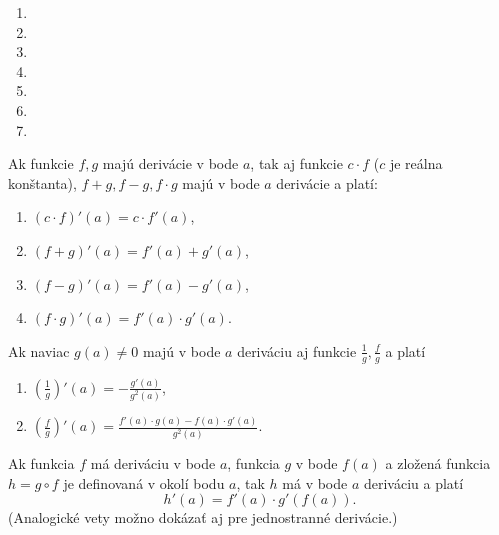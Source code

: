 \begin{enumerate}[resume]
  \item {}
  \item {}
  \item {}
  \item {}
  \item {}
  \item {}
  \item {}
\end{enumerate}

\begin{veta}
Ak funkcie $f,g$ majú derivácie v bode $a$, tak aj funkcie $c \cdot f$ ($c$ je
reálna konštanta), $f+g,f-g,f\cdot g$ majú v bode $a$ derivácie a platí:
\begin{enumerate}
\item $(c\cdot f)'(a)=c\cdot f'(a)$,
\item $(f+g)'(a)=f'(a)+g'(a)$,
\item $(f-g)'(a)=f'(a)-g'(a)$,
\item $(f\cdot g)'(a)=f'(a)\cdot g'(a)$.
\end{enumerate}
Ak naviac $g(a)\neq 0$ majú v bode $a$ deriváciu aj funkcie
$\frac{1}{g},\frac{f}{g}$ a platí
\begin{enumerate}
\item $(\frac{1}{g})'(a)=-\frac{g'(a)}{g^2(a)}$,
\item $(\frac{f}{g})'(a)=\frac{f'(a)\cdot g(a)-f(a)\cdot g'(a)}{g^2 (a)}$.
\end{enumerate}
\end{veta}

\begin{veta}
Ak funkcia $f$ má deriváciu v bode $a$, funkcia $g$ v bode $f(a)$ a zložená
funkcia $h=g \circ f$ je definovaná v okolí bodu $a$, tak $h$ má v bode $a$
deriváciu a platí $$h'(a)=f'(a)\cdot g'(f(a)).$$ (Analogické vety možno dokázať
aj pre jednostranné derivácie.)
\end{veta}

